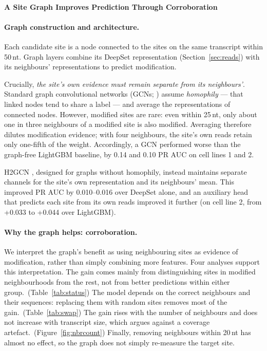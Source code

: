 \documentclass[11pt,a4paper]{article}
\begin{document}
\paragraph{A Site Graph Improves Prediction Through Corroboration}


\paragraph{Graph construction and architecture.}
Each candidate site is a node connected to the sites on the same transcript within 50\,nt. Graph layers combine its DeepSet representation (Section~\ref{sec:reads}) with its neighbours' representations to predict modification.

Crucially, \emph{the site's own evidence must remain separate from its neighbours'}. Standard graph convolutional networks (GCNs; \citealp{kipf2017}) assume \emph{homophily} --- that linked nodes tend to share a label --- and average the representations of connected nodes. However, modified sites are rare: even within 25\,nt, only about one in three neighbours of a modified site is also modified. Averaging therefore dilutes modification evidence; with four neighbours, the site's own reads retain only one-fifth of the weight. Accordingly, a GCN performed worse than the graph-free LightGBM baseline, by 0.14 and 0.10 PR AUC on cell lines 1 and 2.

H2GCN \citep{zhu2020}, designed for graphs without homophily, instead maintains separate channels for the site's own representation and its neighbours' mean. This improved PR AUC by 0.010--0.016 over DeepSet alone, and an auxiliary head that predicts each site from its own reads improved it further (on cell line 2, from +0.033 to +0.044 over LightGBM).

\paragraph{Why the graph helps: corroboration.}
We interpret the graph's benefit as using neighbouring sites as evidence of modification, rather than simply combining more features. Four analyses support this interpretation. The gain comes mainly from distinguishing sites in modified neighbourhoods from the rest, not from better predictions within either group.~(Table~\ref{tab:status}) The model depends on the correct neighbours and their sequences: replacing them with random sites removes most of the gain.~(Table~\ref{tab:swap}) The gain rises with the number of neighbours and does not increase with transcript size, which argues against a coverage artefact.~(Figure~\ref{fig:nbrcount}) Finally, removing neighbours within 20\,nt has almost no effect, so the graph does not simply re-measure the target site.
\end{document}
